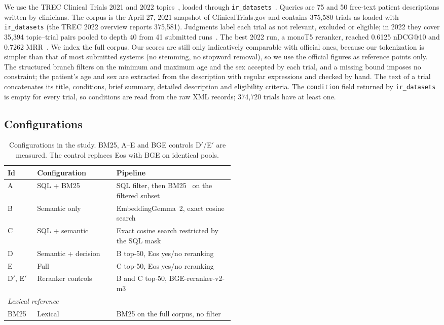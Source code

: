 \documentclass{article}
\begin{document}
We use the TREC Clinical Trials 2021 and 2022 topics~\citep{roberts2021trecct}, loaded through \texttt{ir\_datasets}~\citep{irdatasets}. Queries are 75 and 50 free-text patient descriptions written by clinicians. The corpus is the April 27, 2021 snapshot of ClinicalTrials.gov and contains 375{,}580 trials as loaded with \texttt{ir\_datasets} (the TREC 2022 overview reports 375{,}581). Judgments label each trial as not relevant, excluded or eligible; in 2022 they cover 35{,}394 topic--trial pairs pooled to depth 40 from 41 submitted runs~\citep{roberts2022trecct}. The best 2022 run, a monoT5 reranker, reached 0.6125 nDCG@10 and 0.7262 MRR~\citep{roberts2022trecct}. We index the full corpus. Our scores are still only indicatively comparable with official ones, because our tokenization is simpler than that of most submitted systems (no stemming, no stopword removal), so we use the official figures as reference points only. The structured branch filters on the minimum and maximum age and the sex accepted by each trial, and a missing bound imposes no constraint; the patient's age and sex are extracted from the description with regular expressions and checked by hand. The text of a trial concatenates its title, conditions, brief summary, detailed description and eligibility criteria. The \texttt{condition} field returned by \texttt{ir\_datasets} is empty for every trial, so conditions are read from the raw XML records; 374{,}720 trials have at least one.



\subsection{Configurations}

\begin{table}[t]
  \caption{Configurations in the study. BM25, A--E and BGE controls D$'$/E$'$ are measured. The control replaces Eos with BGE on identical pools.}
  \label{tab:configs}
  \centering
  \small
  \begin{tabular}{llp{0.52\linewidth}}
    \toprule
    Id & Configuration & Pipeline \\
    \midrule
    A & SQL + BM25 & SQL filter, then BM25~\citep{robertson2009bm25} on the filtered subset \\
    B & Semantic only & EmbeddingGemma~2, exact cosine search \\
    C & SQL + semantic & Exact cosine search restricted by the SQL mask \\
    D & Semantic + decision & B top-50, Eos yes/no reranking \\
    E & Full & C top-50, Eos yes/no reranking \\
    D$'$, E$'$ & Reranker controls & B and C top-50, BGE-reranker-v2-m3~\citep{chen2024bgem3} \\
    \midrule
    \multicolumn{3}{l}{\emph{Lexical reference}} \\
    BM25 & Lexical & BM25 on the full corpus, no filter \\
    \bottomrule
  \end{tabular}
\end{table}
\end{document}
